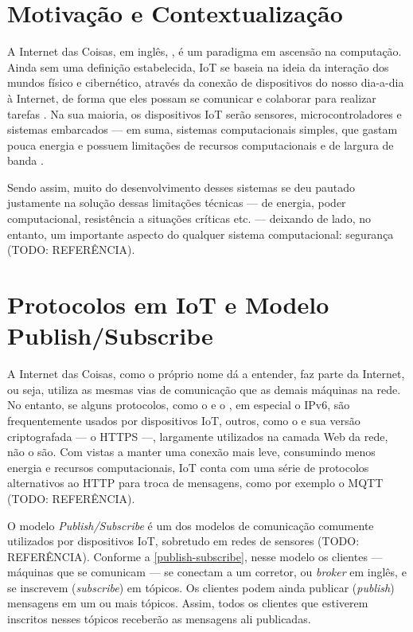 \section{Motivação e Contextualização}
A Internet das Coisas, em inglês, , é um paradigma em ascensão na computação. Ainda sem uma definição estabelecida, IoT se baseia na ideia da interação dos mundos físico e cibernético, através da conexão de dispositivos do nosso dia-a-dia à Internet, de forma que eles possam se comunicar e colaborar para realizar tarefas \cite{Al-Fuqaha2015Internet}. Na sua maioria, os dispositivos IoT serão sensores, microcontroladores e sistemas embarcados --- em suma, sistemas computacionais simples, que gastam pouca energia e possuem limitações de recursos computacionais e de largura de banda \cite{Atzori2010Internet}.

Sendo assim, muito do desenvolvimento desses sistemas se deu pautado justamente na solução dessas limitações técnicas --- de energia, poder computacional, resistência a situações críticas etc. --- deixando de lado, no entanto, um importante aspecto do qualquer sistema computacional: segurança (TODO: REFERÊNCIA). 








\section{Protocolos em IoT e Modelo Publish/Subscribe}

A Internet das Coisas, como o próprio nome dá a entender, faz parte da Internet, ou seja, utiliza as mesmas vias de comunicação que as demais máquinas na rede. No entanto, se alguns protocolos, como o  e o , em especial o IPv6, são frequentemente usados por dispositivos IoT, outros, como o  e sua versão criptografada --- o HTTPS ---, largamente utilizados na camada Web da rede, não o são. Com vistas a manter uma conexão mais leve, consumindo menos energia e recursos computacionais, IoT conta com uma série de protocolos alternativos ao HTTP para troca de mensagens, como por exemplo o MQTT (TODO: REFERÊNCIA).

O modelo \emph{Publish/Subscribe} é um dos modelos de comunicação comumente utilizados por dispositivos IoT, sobretudo em redes de sensores (TODO: REFERÊNCIA). Conforme a \autoref{publish-subscribe}, nesse modelo os clientes --- máquinas que se comunicam --- se conectam a um corretor, ou \emph{broker} em inglês, e se inscrevem (\emph{subscribe}) em tópicos. Os clientes podem ainda publicar (\emph{publish}) mensagens em um ou mais tópicos. Assim, todos os clientes que estiverem inscritos nesses tópicos receberão as mensagens ali publicadas.


